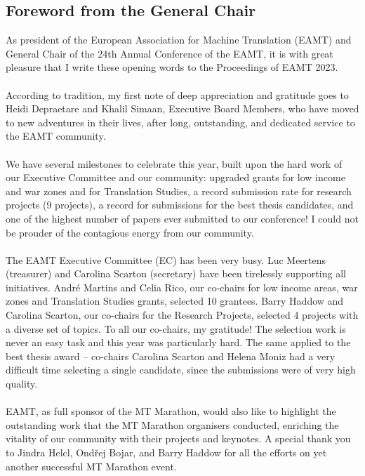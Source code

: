 \documentclass[a4paper,11pt,twoside]{book}
\begin{document}
\begin{onehalfspacing}

\chapter*{Foreword from the General Chair}
\noindent
As president of the European Association for Machine Translation (EAMT) and General Chair of the 24th Annual Conference of the EAMT, it is with great pleasure that I write these opening words to the Proceedings of EAMT 2023.\\
\\
\noindent
According to tradition, my first note of deep appreciation and gratitude goes to Heidi Depraetare and Khalil Simaan, Executive Board Members, who have moved to new adventures in their lives, after long, outstanding, and dedicated service to the EAMT community.\\
\\
\noindent
We have several milestones to celebrate this year, built upon the hard work of our Executive Committee and our community: upgraded grants for low income and war zones and for Translation Studies, a record submission rate for research projects (9 projects), a record for submissions for the best thesis candidates, and one of the highest number of papers ever submitted to our conference! I could not be prouder of the contagious energy from our community.\\
\\
\noindent
The EAMT Executive Committee (EC) has been very busy. Luc Meertens (treasurer) and Carolina Scarton (secretary) have been tirelessly supporting all initiatives. André Martins and Celia Rico, our co-chairs for low income areas, war zones and Translation Studies grants, selected 10 grantees. Barry Haddow and Carolina Scarton, our co-chairs for the Research Projects, selected 4 projects with a diverse set of topics. To all our co-chairs, my gratitude! The selection work is never an easy task and this year was particularly hard. The same applied to the best thesis award – co-chairs Carolina Scarton and Helena Moniz had a very difficult time selecting a single candidate, since the submissions were of very high quality.\\  
\\
\noindent
EAMT, as full sponsor of the MT Marathon, would also like to highlight the outstanding work that the MT Marathon organisers conducted, enriching the vitality of our community with their projects and keynotes. A special thank you to Jindra Helcl, Ond\v{r}ej Bojar, and Barry Haddow for all the efforts on yet another successful MT Marathon event.\\

\end{onehalfspacing}
\end{document}
